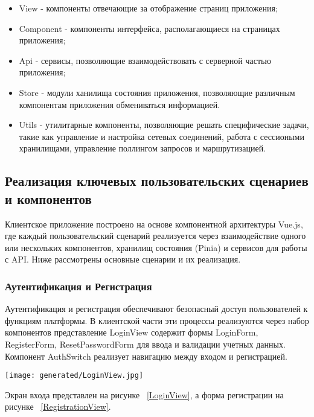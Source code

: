 \begin{itemize}
  \item[---] View - компоненты отвечающие за отображение страниц приложения;
  \item[---] Component - компоненты интерфейса, располагающиеся на страницах приложения;
  \item[---] Api - сервисы, позволяющие взаимодействовать с серверной частью приложения;
  \item[---] Store - модули ханилища состояния приложения, позволяющие различным компонентам приложения обмениваться информацией.
  \item[---] Utils - утилитарные компоненты, позволяющие решать специфические задачи, такие как управление и настройка сетевых соединений, работа с сессиоными хранилищами, управление поллингом запросов и маршрутизацией. 
\end{itemize}

\subsection{Реализация ключевых пользовательских сценариев и компонентов}

Клиентское приложение построено на основе компонентной архитектуры Vue.js, где каждый пользовательский сценарий реализуется через взаимодействие одного или нескольких компонентов, хранилищ состояния (Pinia) и сервисов для работы с API. Ниже рассмотрены основные сценарии и их реализация.

\subsubsection{Аутентификация и Регистрация}

Аутентификация и регистрация обеспечивают безопасный доступ пользователей к функциям платформы. В клиентской части эти процессы реализуются через набор компонентов представление LoginView содержит формы LoginForm, RegisterForm, ResetPasswordForm для ввода и валидации учетных данных. Компонент AuthSwitch реализует навигацию между входом и регистрацией.

\begin{figure*}[!t]
  \centering
  \texttt{[image: generated/LoginView.jpg]}
  \caption{Форма входа}
  \label{LoginView}
\end{figure*}

Экран входа представлен на рисунке ~\ref{LoginView}, а форма регистрации на рисунке ~\ref{RegistrationView}.

